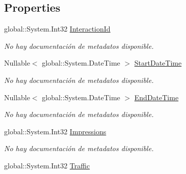 \subsection*{Properties}
\begin{DoxyCompactItemize}
\item 
global\-::\-System.\-Int32 \hyperlink{class_microsoft_1_1_samples_1_1_kinect_1_1_basic_interactions_1_1_interactions_a6019ee1d645718e8cab10a7821e312a1}{Interaction\-Id}
\begin{DoxyCompactList}\small\item\em No hay documentación de metadatos disponible. \end{DoxyCompactList}\item 
Nullable$<$ global\-::\-System.\-Date\-Time $>$ \hyperlink{class_microsoft_1_1_samples_1_1_kinect_1_1_basic_interactions_1_1_interactions_aebeb80ef93a07b7a3b5c23d7555dd95e}{Start\-Date\-Time}
\begin{DoxyCompactList}\small\item\em No hay documentación de metadatos disponible. \end{DoxyCompactList}\item 
Nullable$<$ global\-::\-System.\-Date\-Time $>$ \hyperlink{class_microsoft_1_1_samples_1_1_kinect_1_1_basic_interactions_1_1_interactions_a86e2940cfbdd262bbb5d2c5622322b05}{End\-Date\-Time}
\begin{DoxyCompactList}\small\item\em No hay documentación de metadatos disponible. \end{DoxyCompactList}\item 
global\-::\-System.\-Int32 \hyperlink{class_microsoft_1_1_samples_1_1_kinect_1_1_basic_interactions_1_1_interactions_a7264d2d1bc92ae3886a02ce30a0c3733}{Impressions}
\begin{DoxyCompactList}\small\item\em No hay documentación de metadatos disponible. \end{DoxyCompactList}\item 
global\-::\-System.\-Int32 \hyperlink{class_microsoft_1_1_samples_1_1_kinect_1_1_basic_interactions_1_1_interactions_a0f6b219d330c4355fa4cb174a5b77c80}{Traffic}

\end{DoxyCompactItemize}
